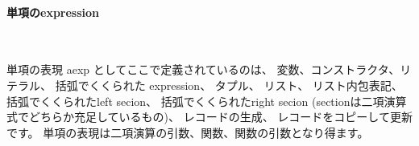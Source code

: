 \documentclass[mingoth,a4paper]{jsarticle}
\begin{document}












\paragraph{単項のexpression} \ 

単項の表現 aexp としてここで定義されているのは、
変数、コンストラクタ、リテラル、 括弧でくくられた expression、 タプル、 リスト、 リスト内包表記、 括弧でくくられたleft secion、
括弧でくくられたright secion (sectionは二項演算式でどちらか充足しているもの)、 レコードの生成、 レコードをコピーして更新です。
単項の表現は二項演算の引数、関数、関数の引数となり得ます。
\end{document}
